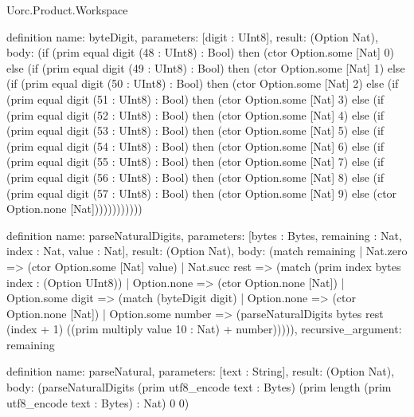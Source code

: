 \begin{lexlean}{Uorc.Product.Workspace}
\begin{semanticmodule}
definition{
  name: byteDigit,
  parameters: [digit : UInt8],
  result: (Option Nat),
  body: (if (prim equal digit (48 : UInt8) : Bool) then (ctor Option.some [Nat] 0) else (if (prim equal digit (49 : UInt8) : Bool) then (ctor Option.some [Nat] 1) else (if (prim equal digit (50 : UInt8) : Bool) then (ctor Option.some [Nat] 2) else (if (prim equal digit (51 : UInt8) : Bool) then (ctor Option.some [Nat] 3) else (if (prim equal digit (52 : UInt8) : Bool) then (ctor Option.some [Nat] 4) else (if (prim equal digit (53 : UInt8) : Bool) then (ctor Option.some [Nat] 5) else (if (prim equal digit (54 : UInt8) : Bool) then (ctor Option.some [Nat] 6) else (if (prim equal digit (55 : UInt8) : Bool) then (ctor Option.some [Nat] 7) else (if (prim equal digit (56 : UInt8) : Bool) then (ctor Option.some [Nat] 8) else (if (prim equal digit (57 : UInt8) : Bool) then (ctor Option.some [Nat] 9) else (ctor Option.none [Nat])))))))))))
}

definition{
  name: parseNaturalDigits,
  parameters: [bytes : Bytes, remaining : Nat, index : Nat, value : Nat],
  result: (Option Nat),
  body: (match remaining
    | Nat.zero => (ctor Option.some [Nat] value)
    | Nat.succ rest => (match (prim index bytes index : (Option UInt8))
      | Option.none => (ctor Option.none [Nat])
      | Option.some digit => (match (byteDigit digit)
        | Option.none => (ctor Option.none [Nat])
        | Option.some number => (parseNaturalDigits bytes rest (index + 1) ((prim multiply value 10 : Nat) + number))))),
  recursive_argument: remaining
}

definition{
  name: parseNatural,
  parameters: [text : String],
  result: (Option Nat),
  body: (parseNaturalDigits (prim utf8_encode text : Bytes) (prim length (prim utf8_encode text : Bytes) : Nat) 0 0)
}


\end{semanticmodule}
\end{lexlean}
